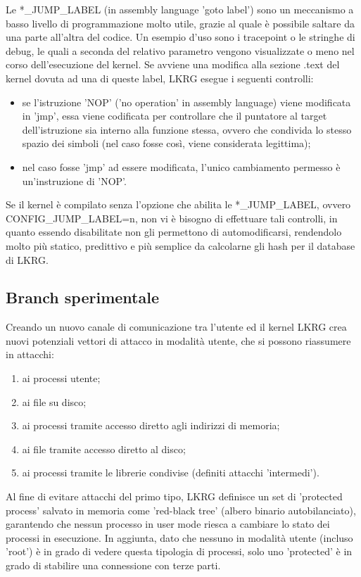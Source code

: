 Le *\_JUMP\_LABEL (in assembly language 'goto label') sono un meccanismo a basso livello di programmazione molto utile, grazie al quale è possibile saltare da una parte all'altra del codice. Un esempio d'uso sono i tracepoint o le stringhe di debug, le quali a seconda del relativo parametro vengono visualizzate o meno nel corso dell'esecuzione del kernel. Se avviene una modifica alla sezione .text del kernel dovuta ad una di queste label, LKRG esegue i seguenti controlli:

\begin{itemize}
\item se l'istruzione 'NOP' ('no operation' in assembly language) viene modificata in 'jmp', essa viene codificata per controllare che il puntatore al target dell'istruzione sia interno alla funzione stessa, ovvero che condivida lo stesso spazio dei simboli (nel caso fosse così, viene considerata legittima);
\item nel caso fosse 'jmp' ad essere modificata, l'unico cambiamento permesso è un'instruzione di 'NOP'.
\end{itemize}

Se il kernel è compilato senza l'opzione che abilita le *\_JUMP\_LABEL, ovvero CONFIG\_JUMP\_LABEL=n, non vi è bisogno di effettuare tali controlli, in quanto essendo disabilitate non gli permettono di automodificarsi, rendendolo molto più statico, predittivo e più semplice da calcolarne gli hash per il database di LKRG.

\subsection{Branch sperimentale}

Creando un nuovo canale di comunicazione tra l'utente ed il kernel LKRG crea nuovi potenziali vettori di attacco in modalità utente, che si possono riassumere in attacchi:

\begin{enumerate}
\item ai processi utente;
\item ai file su disco;
\item ai processi tramite accesso diretto agli indirizzi di memoria;
\item ai file tramite accesso diretto al disco;
\item ai processi tramite le librerie condivise (definiti attacchi 'intermedi').
\end{enumerate}

Al fine di evitare attacchi del primo tipo, LKRG definisce un set di 'protected process' salvato in memoria come 'red-black tree' (albero binario autobilanciato), garantendo che nessun processo in user mode riesca a cambiare lo stato dei processi in esecuzione. In aggiunta, dato che nessuno in modalità utente (incluso 'root') è in grado di vedere questa tipologia di processi, solo uno 'protected' è in grado di stabilire una connessione con terze parti.

